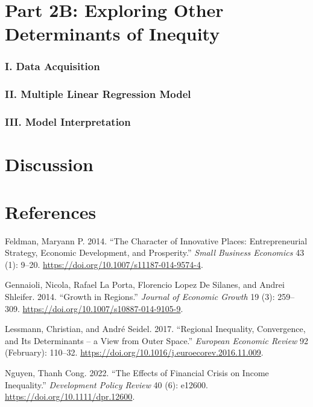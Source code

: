 \documentclass[
  a4paper,
  DIV=11,
  numbers=noendperiod]{scrartcl}
\newlength{\cslhangindent}
\newlength{\cslentryspacingunit} %
\newenvironment{CSLReferences}[2] %
 {%
  \setlength{\parindent}{0pt}
  \ifodd #1
  \let\oldpar\par
  \def\par{\hangindent=\cslhangindent\oldpar}
  \fi
  \setlength{\parskip}{#2\cslentryspacingunit}
 }%
 {}
\begin{document}
\hypertarget{part-2b-exploring-other-determinants-of-inequity}{%
\section{Part 2B: Exploring Other Determinants of
Inequity}\label{part-2b-exploring-other-determinants-of-inequity}}

\hypertarget{i.-data-acquisition}{%
\subsubsection{I. Data Acquisition}\label{i.-data-acquisition}}

\hypertarget{ii.-multiple-linear-regression-model}{%
\subsubsection{II. Multiple Linear Regression
Model}\label{ii.-multiple-linear-regression-model}}

\hypertarget{iii.-model-interpretation}{%
\subsubsection{III. Model
Interpretation}\label{iii.-model-interpretation}}

\hypertarget{discussion}{%
\section{Discussion}\label{discussion}}

\hypertarget{references}{%
\section*{References}\label{references}}

\hypertarget{refs}{}
\begin{CSLReferences}{1}{0}
\leavevmode{}%
Feldman, Maryann P. 2014. {``The Character of Innovative Places:
Entrepreneurial Strategy, Economic Development, and Prosperity.''}
\emph{Small Business Economics} 43 (1): 9--20.
\url{https://doi.org/10.1007/s11187-014-9574-4}.

\leavevmode{}%
Gennaioli, Nicola, Rafael La Porta, Florencio Lopez De Silanes, and
Andrei Shleifer. 2014. {``Growth in Regions.''} \emph{Journal of
Economic Growth} 19 (3): 259--309.
\url{https://doi.org/10.1007/s10887-014-9105-9}.

\leavevmode{}%
Lessmann, Christian, and André Seidel. 2017. {``Regional Inequality,
Convergence, and Its Determinants -- a View from Outer Space.''}
\emph{European Economic Review} 92 (February): 110--32.
\url{https://doi.org/10.1016/j.euroecorev.2016.11.009}.

\leavevmode{}%
Nguyen, Thanh Cong. 2022. {``The Effects of Financial Crisis on Income
Inequality.''} \emph{Development Policy Review} 40 (6): e12600.
\url{https://doi.org/10.1111/dpr.12600}.

\end{CSLReferences}
\end{document}
